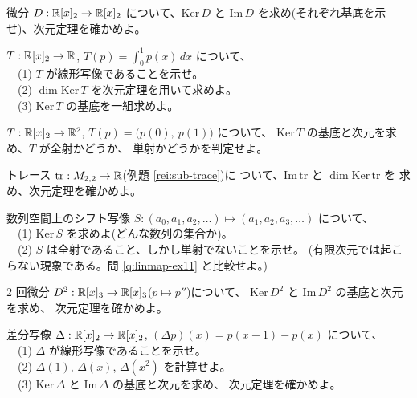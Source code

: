 \begin{mondai}[基本]\label{q:linmap-ex4}
微分 $D : \mathbb{R}[x]_2 \to \mathbb{R}[x]_2$ について、$\mathrm{Ker}\,D$ と
$\mathrm{Im}\,D$ を求め(それぞれ基底を示せ)、次元定理を確かめよ。
\end{mondai}

\begin{mondai}[標準]\label{q:linmap-ex5}
$T : \mathbb{R}[x]_2 \to \mathbb{R}$, $T(p) = \displaystyle\int_0^1 p(x)\,dx$ について、\\
　(1) $T$ が線形写像であることを示せ。\\
　(2) $\dim \mathrm{Ker}\,T$ を次元定理を用いて求めよ。\\
　(3) $\mathrm{Ker}\,T$ の基底を一組求めよ。
\end{mondai}

\begin{mondai}[標準]\label{q:linmap-ex6}
$T : \mathbb{R}[x]_2 \to \mathbb{R}^2$, $T(p) = \bigl(p(0),\ p(1)\bigr)$ について、
$\mathrm{Ker}\,T$ の基底と次元を求め、$T$ が全射かどうか、
単射かどうかを判定せよ。
\end{mondai}

\begin{mondai}[標準]\label{q:linmap-ex7}
トレース $\mathrm{tr} : M_{2,2} \to \mathbb{R}$(例題 \ref{rei:sub-trace})に
ついて、$\mathrm{Im}\,\mathrm{tr}$ と $\dim \mathrm{Ker}\,\mathrm{tr}$ を
求め、次元定理を確かめよ。
\end{mondai}

\begin{mondai}[標準]\label{q:linmap-ex8}
数列空間上のシフト写像
$S : (a_0, a_1, a_2, \dots) \mapsto (a_1, a_2, a_3, \dots)$ について、\\
　(1) $\mathrm{Ker}\,S$ を求めよ(どんな数列の集合か)。\\
　(2) $S$ は全射であること、しかし単射でないことを示せ。
(有限次元では起こらない現象である。問 \ref{q:linmap-ex11} と比較せよ。)
\end{mondai}

\begin{mondai}[発展]\label{q:linmap-ex9}
$2$ 回微分 $D^2 : \mathbb{R}[x]_3 \to \mathbb{R}[x]_3$($p \mapsto p''$)について、
$\mathrm{Ker}\,D^2$ と $\mathrm{Im}\,D^2$ の基底と次元を求め、
次元定理を確かめよ。
\end{mondai}

\begin{mondai}[発展]\label{q:linmap-ex10}
差分写像 $\Delta : \mathbb{R}[x]_2 \to \mathbb{R}[x]_2$,
$(\Delta p)(x) = p(x + 1) - p(x)$ について、\\
　(1) $\Delta$ が線形写像であることを示せ。\\
　(2) $\Delta(1)$, $\Delta(x)$, $\Delta(x^2)$ を計算せよ。\\
　(3) $\mathrm{Ker}\,\Delta$ と $\mathrm{Im}\,\Delta$ の基底と次元を求め、
次元定理を確かめよ。
\end{mondai}

